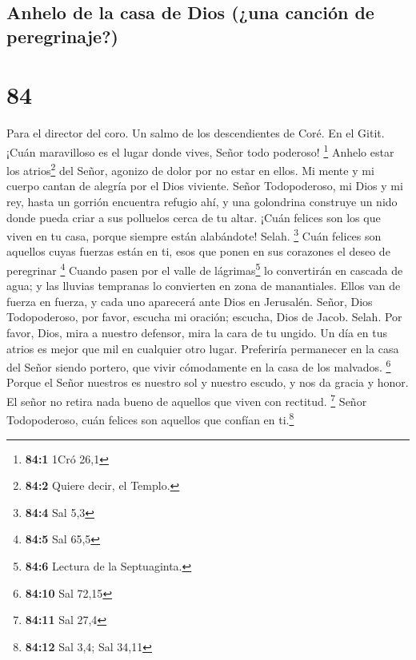 \hypertarget{anhelo-de-la-casa-de-dios-una-canciuxf3n-de-peregrinaje}{%
\subsection{Anhelo de la casa de Dios (¿una canción de
peregrinaje?)}\label{anhelo-de-la-casa-de-dios-una-canciuxf3n-de-peregrinaje}}

\hypertarget{section-83}{%
\section{84}\label{section-83}}

Para el director del coro. Un salmo de los descendientes de Coré. En el
Gitit.  ¡Cuán maravilloso es el lugar donde vives, Señor
todo poderoso! \footnote{\textbf{84:1} 1Cró 26,1}  Anhelo
estar los atrios\footnote{\textbf{84:2} Quiere decir, el Templo.} del
Señor, agonizo de dolor por no estar en ellos. Mi mente y mi cuerpo
cantan de alegría por el Dios viviente.  Señor
Todopoderoso, mi Dios y mi rey, hasta un gorrión encuentra refugio ahí,
y una golondrina construye un nido donde pueda criar a sus polluelos
cerca de tu altar.  ¡Cuán felices son los que viven en tu
casa, porque siempre están alabándote! Selah. \footnote{\textbf{84:4}
  Sal 5,3}  Cuán felices son aquellos cuyas fuerzas están
en ti, esos que ponen en sus corazones el deseo de peregrinar
\footnote{\textbf{84:5} Sal 65,5}  Cuando pasen por el
valle de lágrimas\footnote{\textbf{84:6} Lectura de la Septuaginta.} lo
convertirán en cascada de agua; y las lluvias tempranas lo convierten en
zona de manantiales.  Ellos van de fuerza en fuerza, y
cada uno aparecerá ante Dios en Jerusalén.  Señor, Dios
Todopoderoso, por favor, escucha mi oración; escucha, Dios de Jacob.
Selah.  Por favor, Dios, mira a nuestro defensor, mira la
cara de tu ungido.  Un día en tus atrios es mejor que mil
en cualquier otro lugar. Preferiría permanecer en la casa del Señor
siendo portero, que vivir cómodamente en la casa de los malvados.
\footnote{\textbf{84:10} Sal 72,15}  Porque el Señor
nuestros es nuestro sol y nuestro escudo, y nos da gracia y honor. El
señor no retira nada bueno de aquellos que viven con rectitud.
\footnote{\textbf{84:11} Sal 27,4}  Señor Todopoderoso,
cuán felices son aquellos que confían en ti.\footnote{\textbf{84:12} Sal
  3,4; Sal 34,11}


